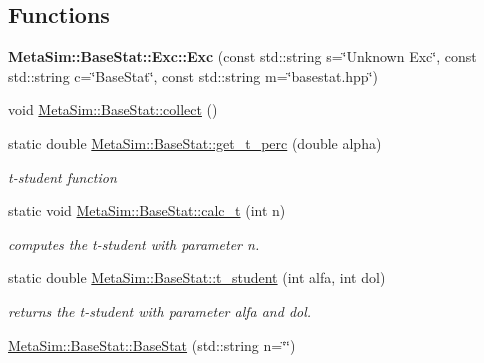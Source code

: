 \subsection*{Functions}
\begin{DoxyCompactItemize}
\item 
{\bfseries Meta\+Sim\+::\+Base\+Stat\+::\+Exc\+::\+Exc} (const std\+::string s=\char`\"{}Unknown Exc\char`\"{}, const std\+::string c=\char`\"{}Base\+Stat\char`\"{}, const std\+::string m=\char`\"{}basestat.\+hpp\char`\"{})\hypertarget{group__metasim__stat_gaf7fcea77b41c9a6f32a88f3a1c68871d}{}\label{group__metasim__stat_gaf7fcea77b41c9a6f32a88f3a1c68871d}

\item 
void \hyperlink{group__metasim__stat_gac2088baeeca5cfd9d8b6393831118e98}{Meta\+Sim\+::\+Base\+Stat\+::collect} ()
\item 
static double \hyperlink{group__metasim__stat_ga2001c33bd7f3a451b279cc0e7be1bcab}{Meta\+Sim\+::\+Base\+Stat\+::get\+\_\+t\+\_\+perc} (double alpha)\hypertarget{group__metasim__stat_ga2001c33bd7f3a451b279cc0e7be1bcab}{}\label{group__metasim__stat_ga2001c33bd7f3a451b279cc0e7be1bcab}

\begin{DoxyCompactList}\small\item\em t-\/student function \end{DoxyCompactList}\item 
static void \hyperlink{group__metasim__stat_ga4b367dd65c3cbaba03adfc6b2105a4d1}{Meta\+Sim\+::\+Base\+Stat\+::calc\+\_\+t} (int n)\hypertarget{group__metasim__stat_ga4b367dd65c3cbaba03adfc6b2105a4d1}{}\label{group__metasim__stat_ga4b367dd65c3cbaba03adfc6b2105a4d1}

\begin{DoxyCompactList}\small\item\em computes the t-\/student with parameter n. \end{DoxyCompactList}\item 
static double \hyperlink{group__metasim__stat_ga72c3e88d10989f82926d1e4622a741a2}{Meta\+Sim\+::\+Base\+Stat\+::t\+\_\+student} (int alfa, int dol)\hypertarget{group__metasim__stat_ga72c3e88d10989f82926d1e4622a741a2}{}\label{group__metasim__stat_ga72c3e88d10989f82926d1e4622a741a2}

\begin{DoxyCompactList}\small\item\em returns the t-\/student with parameter alfa and dol. \end{DoxyCompactList}\item 
\hyperlink{group__metasim__stat_ga53f0b2d86cefc177d2c6c8960fb96ad9}{Meta\+Sim\+::\+Base\+Stat\+::\+Base\+Stat} (std\+::string n=\char`\"{}\char`\"{})\hypertarget{group__metasim__stat_ga53f0b2d86cefc177d2c6c8960fb96ad9}{}\label{group__metasim__stat_ga53f0b2d86cefc177d2c6c8960fb96ad9}


\end{DoxyCompactItemize}
